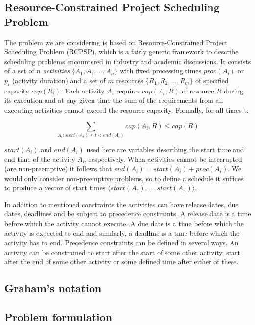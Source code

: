 \documentclass{article}
\theoremstyle{definition}
\begin{document}
\subsection{Resource-Constrained Project Scheduling Problem}
The problem we are considering is based on Resource-Constrained Project Scheduling Problem (RCPSP), which is a fairly generic framework to describe scheduling problems encountered in industry and academic discussions. It consists of a set of $n$ \textit{activities} $\{A_1, A_2, ..., A_n\}$ with fixed processing times $proc(A_i)$ or $p_i$ (activity duration) and a set of $m$ resources $\{R_1, R_2, ..., R_m\}$ of specified capacity $cap(R_i)$. Each activity $A_i$ requires $cap(A_i, R)$ of resource $R$ during its execution and at any given time the sum of the requirements from all executing activities cannot exceed the resource capacity. Formally, for all times t:

$$
\sum_{A_i : start(A_i) \leq t < end(A_i)} cap(A_i, R) \leq cap(R)
$$

$start(A_i)$ and $end(A_i)$ used here are variables describing the start time and end time of the activity $A_i$, respectively. When activities cannot be interrupted (are non-preemptive) it follows that $end(A_i) = start(A_i) + proc(A_i)$. We would only consider non-preemptive problems, so to define a schedule it suffices to produce a vector of start times $\langle start(A_1), ..., start(A_n)\rangle$.

In addition to mentioned constraints the activities can have release dates, due dates, deadlines and be subject to precedence constraints. A release date is a time before which the activity cannot execute. A due date is a time before which the activity is expected to end and similarly, a deadline is a time before which the activity has to end. Precedence constraints can be defined in several ways. An activity can be constrained to start after the start of some other activity, start after the end of some other activity or some defined time after either of these.


\subsection{Graham's notation}

\subsection{Problem formulation}
\end{document}
